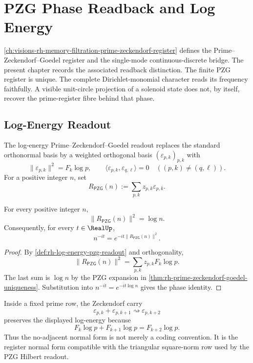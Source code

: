 \chapter{PZG Phase Readback and Log Energy}
\label{ch:visions-rh-pzg-phase-readback-log-energy}

\autoref{ch:visions-rh-memory-filtration-prime-zeckendorf-register}
defines the Prime--Zeckendorf--Goedel register and the single-mode
continuous-discrete bridge. The present chapter records the associated
readback distinction. The finite PZG register is unique. The complete
Dirichlet-monomial character reads its frequency faithfully. A visible
unit-circle projection of a solenoid state does not, by itself, recover
the prime-register fibre behind that phase.

\section{Log-Energy Readout}
\label{sec:rh-pzg-log-energy-readout}

\begin{definition}
\label{def:rh-log-energy-pzg-readout}
The log-energy Prime--Zeckendorf--Goedel readout replaces the standard
orthonormal basis by a weighted orthogonal basis
$(\varepsilon_{p,k})_{p,k}$ with
$$
\|\varepsilon_{p,k}\|^2=F_k\log p,
\qquad
\langle\varepsilon_{p,k},\varepsilon_{q,\ell}\rangle=0
\quad
((p,k)\ne(q,\ell)).
$$
For a positive integer $n$, set
$$
R_{\mathsf{PZG}}(n)
:=
\sum_{p,k}z_{p,k}\varepsilon_{p,k}.
$$
\end{definition}

\begin{theorem}
\label{thm:rh-log-energy-reads-logarithmic-height}
For every positive integer $n$,
$$
\|R_{\mathsf{PZG}}(n)\|^2=\log n.
$$
Consequently, for every $t\in\RealUp$,
$$
n^{-it}=e^{-it\|R_{\mathsf{PZG}}(n)\|^2}.
$$
\end{theorem}

\begin{proof}
By \autoref{def:rh-log-energy-pzg-readout} and orthogonality,
$$
\|R_{\mathsf{PZG}}(n)\|^2
=
\sum_{p,k}z_{p,k}F_k\log p.
$$
The last sum is $\log n$ by the PZG expansion in
\autoref{thm:rh-prime-zeckendorf-goedel-uniqueness}. Substitution into
$n^{-it}=e^{-it\log n}$ gives the phase identity.
\end{proof}

\begin{principle}
\label{prin:rh-zeckendorf-carries-preserve-log-energy}
Inside a fixed prime row, the Zeckendorf carry
$$
\varepsilon_{p,k}+\varepsilon_{p,k+1}
\rightsquigarrow
\varepsilon_{p,k+2}
$$
preserves the displayed log-energy because
$$
F_k\log p+F_{k+1}\log p=F_{k+2}\log p.
$$
Thus the no-adjacent normal form is not merely a coding convention. It
is the register normal form compatible with the triangular square-norm
row used by the PZG Hilbert readout.
\end{principle}

